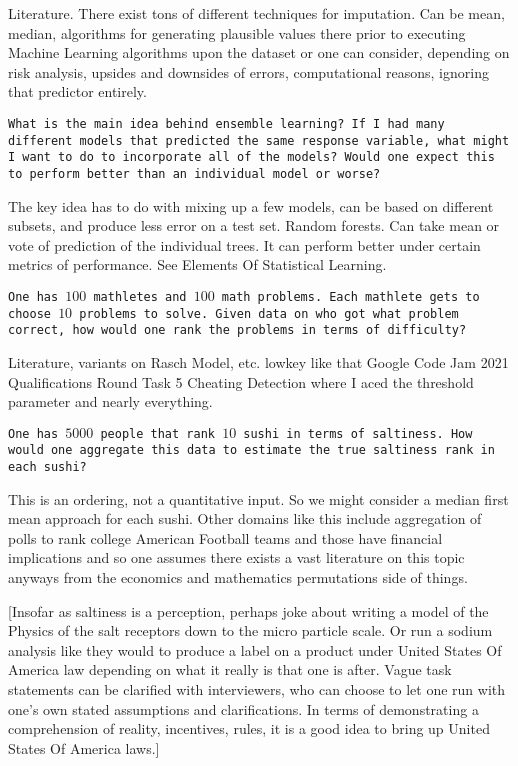 Literature. There exist tons of different techniques for imputation. Can be mean, median, algorithms for generating plausible values there prior to executing Machine Learning algorithms upon the dataset or one can consider, depending on risk analysis, upsides and downsides of errors, computational reasons, ignoring that predictor entirely.

\texttt{What is the main idea behind ensemble learning? If I had many different models that predicted the same response variable, what might I want to do to incorporate all of the models? Would one expect this to perform better than an individual model or worse?}

The key idea has to do with mixing up a few models, can be based on different subsets, and produce less error on a test set. Random forests. Can take mean or vote of prediction of the individual trees. It can perform better under certain metrics of performance. See Elements Of Statistical Learning.

\texttt{One has $100$ mathletes and $100$ math problems. Each mathlete gets to choose $10$ problems to solve. Given data on who got what problem correct, how would one rank the problems in terms of difficulty?}

Literature, variants on Rasch Model, etc. lowkey like that Google Code Jam 2021 Qualifications Round Task 5 Cheating Detection where I aced the threshold parameter and nearly everything.

\texttt{One has $5000$ people that rank $10$ sushi in terms of saltiness. How would one aggregate this data to estimate the true saltiness rank in each sushi?}

This is an ordering, not a quantitative input. So we might consider a median first mean approach for each sushi. Other domains like this include aggregation of polls to rank college American Football teams and those have financial implications and so one assumes there exists a vast literature on this topic anyways from the economics and mathematics permutations side of things.

[Insofar as saltiness is a perception, perhaps joke about writing a model of the Physics of the salt receptors down to the micro particle scale. Or run a sodium analysis like they would to produce a label on a product under United States Of America law depending on what it really is that one is after. Vague task statements can be clarified with interviewers, who can choose to let one run with one's own stated assumptions and clarifications. In terms of demonstrating a comprehension of reality, incentives, rules, it is a good idea to bring up United States Of America laws.]

